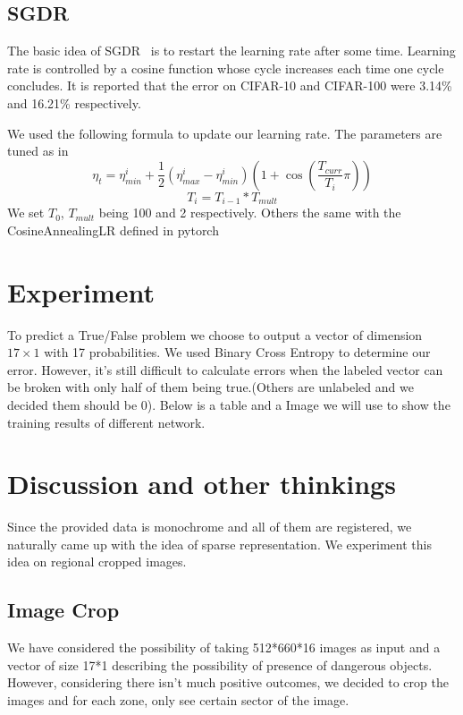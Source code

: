 \documentclass[conference,compsoc]{IEEEtran}
\begin{document}
\subsection{SGDR}
The basic idea of SGDR~\cite{SGDR} is to restart the learning rate after some time. Learning rate is controlled by a cosine function whose cycle increases each time one cycle concludes. It is reported that the error on CIFAR-10 and CIFAR-100 were 3.14\% and 16.21\% respectively. 
\par We used the following formula to update our learning rate. The parameters are tuned as in \cite{SGDR}
$$ \eta_t = \eta_{min}^i + \frac{1}{2}(\eta_{max}^i-\eta_{min}^i)(1 + \cos(\frac{T_{curr}}{T_i}\pi))$$
$$ T_{i} = T_{i-1} * T_{mult} $$
We set $T_0$, $T_{mult}$ being 100 and 2 respectively. Others the same with the CosineAnnealingLR defined in pytorch


\section{Experiment}
To predict a True/False problem we choose to output a vector of dimension $17 \times 1$ with 17 probabilities. 
We used Binary Cross Entropy to determine our error. However, it's still difficult to calculate errors when the labeled vector can be broken with only half of them being true.(Others are unlabeled and we decided them should be 0).
Below is a table and a Image we will use to show the training results of different network.  

\section{Discussion and other thinkings}
Since the provided data is monochrome and all of them are registered, we naturally came up with the idea of sparse representation. We experiment this idea on regional cropped images.

\subsection{Image Crop}
We have considered the possibility of taking 512*660*16 images as input and a vector of size 17*1 describing the possibility of presence of dangerous objects. However, considering there isn't much positive outcomes, we decided to crop the images and for each zone, only see certain sector of the image.
\end{document}
